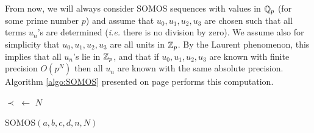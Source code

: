 \documentclass{lms}
\begin{document}
From now, we will always consider SOMOS sequences with values in $\mathbb Q_p$ 
(for some prime number $p$) and assume that $u_0, u_1, u_2, u_3$ are 
chosen such that all terms $u_n$'s are determined (\emph{i.e.} there is 
no division by zero). We assume also for simplicity that $u_0, u_1, u_2, 
u_3$ are all units in $\mathbb Z_p$. By the Laurent phenomenon, this implies 
that all $u_n$'s lie in $\mathbb Z_p$, and that if $u_0, u_1, u_2, u_3$ 
are known with finite precision $O(p^N)$ then all $u_n$ are 
known with the same absolute precision. Algorithm \ref{algo:SOMOS} presented on 
page \pageref{algo:SOMOS} performs this computation.

\begin{algorithm}[t]
\BlankLine
$\prec$ $\leftarrow$ $N$\;
\;
\caption{\sc SOMOS$(a, b, c, d, n, N)$}\label{algo:SOMOS}
\end{algorithm}
\end{document}
